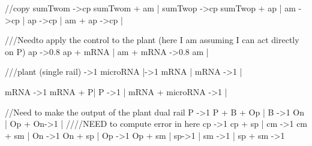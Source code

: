 //copy
sumTwom ->{cp} sumTwom + am |
sumTwop ->{cp} sumTwop + ap |
am ->{cp}  |
ap ->{cp} |
am + ap ->{cp} |


///Needto apply the control to the plant (here I am assuming I can act directly on P)
ap ->{0.8} ap +  mRNA |
am + mRNA ->{0.8} am |

///plant (single rail)
->{1} microRNA
|->{1} mRNA
| mRNA ->{1} |

mRNA ->{1} mRNA + P|
P ->{1} |
mRNA + microRNA ->{1} |


//Need to make the output of the plant dual rail
P ->{1} P + B + Op  | 
B ->{1} On |
Op + On->{1} |
////NEED to compute error in here
cp ->{1} cp + sp |
cm ->{1} cm + sm |
On ->{1} On + sp |
Op ->{1} Op + sm |
sp->{1} |
sm ->{1} |
sp + sm ->{1}